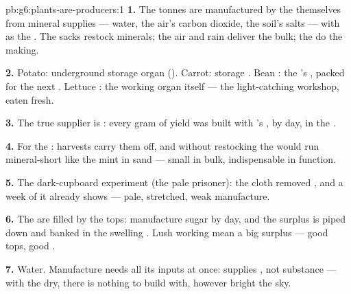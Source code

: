 \begin{solution}{pb:g6:plants-are-producers:1}
\textbf{1.} The tonnes are  manufactured by
the  themselves from mineral supplies --- water, the
air's carbon dioxide, the soil's salts --- with  as the
. The sacks restock minerals; the air and rain deliver
the bulk; the  do the making.

\textbf{2.} Potato: underground storage organ ().
Carrot: storage . Bean : the 's ,
packed for the next . Lettuce : the working organ
itself --- the light-catching workshop, eaten fresh.

\textbf{3.} The true supplier is : every gram of yield
was built with 's , by day, in the .

\textbf{4.} For the : harvests carry them off,
and without restocking the  would run mineral-short
like the mint in sand --- small in bulk, indispensable in
function.

\textbf{5.} The dark-cupboard experiment (the pale
prisoner): the cloth removed , and a week of it already
shows --- pale, stretched, weak manufacture.

\textbf{6.} The  are filled by the tops: 
manufacture sugar by day, and the surplus is piped down and
banked in the swelling . Lush working  mean a
big surplus --- good tops, good .

\textbf{7.} Water. Manufacture needs all its inputs at once:
 supplies , not substance --- with the  dry,
there is nothing to build with, however bright the sky.


\end{solution}
